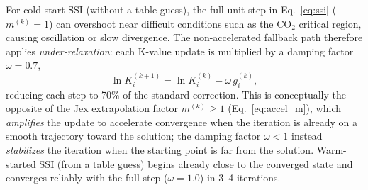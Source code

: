 \documentclass[preprint,12pt,number]{elsarticle}
\begin{document}
For cold-start SSI (without a table guess), the full unit step in Eq.~\eqref{eq:ssi}
($m^{(k)}=1$) can overshoot near difficult conditions such as the CO$_2$ critical region,
causing oscillation or slow divergence.
The non-accelerated fallback path therefore applies \emph{under-relaxation}: each K-value
update is multiplied by a damping factor $\omega = 0.7$,
\begin{equation*}
  \ln K_i^{(k+1)} = \ln K_i^{(k)} - \omega\, g_i^{(k)},
\end{equation*}
reducing each step to 70\% of the standard correction.
This is conceptually the opposite of the Jex extrapolation factor $m^{(k)} \geq 1$
(Eq.~\eqref{eq:accel_m}), which \emph{amplifies} the update to accelerate convergence
when the iteration is already on a smooth trajectory toward the solution;
the damping factor $\omega < 1$ instead \emph{stabilizes} the iteration when the starting
point is far from the solution.
Warm-started SSI (from a table guess) begins already close to the converged state and
converges reliably with the full step ($\omega = 1.0$) in 3--4 iterations.
\end{document}
